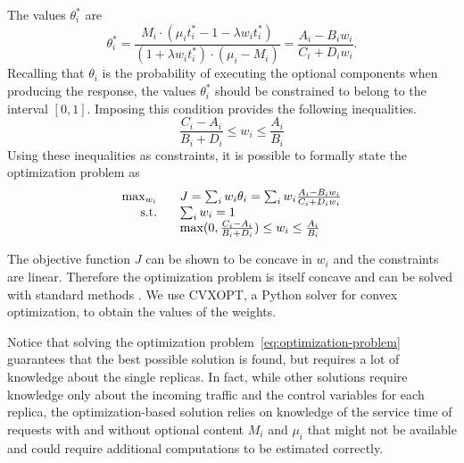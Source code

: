 The values $\theta_i^*$ are
\begin{equation}
  \theta_i^* = \frac{M_i \cdot \left( \mu_i t_i^* - 1 -\lambda w_i
      t_i^* \right)}{{\left( 1+\lambda w_i t_i^* \right) \cdot
      \left(\mu_i-M_i \right)}} = \frac{A_i - B_i w_i}{C_i + D_i w_i}.
  \label{eq:optimal-thetas}
\end{equation}
Recalling that $\theta_i$ is the probability of executing the optional
components when producing the response, the values $\theta_i^*$ should
be constrained to belong to the interval $[0, 1]$. Imposing this
condition provides the following inequalities.
\begin{equation}
  \frac{C_i-A_i}{B_i+D_i} \leq w_i \leq \frac{A_i}{B_i}
  \label{eq:constraints-optimal-thetas}
\end{equation}
Using these inequalities as constraints, it is possible to formally
state the optimization problem as
\begin{equation}
\begin{array}{rl}
  \max_{w_i} \;\;\; & J = \sum_i w_i \theta_i = \sum_i w_i  \frac{A_i - B_i w_i}{C_i + D_i w_i} \\
  \textnormal{s.t.} \;\;\; & \sum_i w_i = 1 \\
  & \max (0,\frac{C_i-A_i}{B_i+D_i}) \leq w_i \leq \frac{A_i}{B_i}
\end{array}
  \label{eq:optimization-problem}
\end{equation}

The objective function $J$ can be shown to be concave in $w_i$ and the
constraints are linear. Therefore the optimization problem is itself
concave and can be solved with standard methods \cite{boydbook}. 
We use CVXOPT, a Python solver for convex optimization, to obtain 
the values of the weights.

Notice that solving the optimization
problem~\eqref{eq:optimization-problem} guarantees that the best
possible solution is found, but requires a lot of knowledge about the
single replicas. In fact, while other solutions require knowledge only
about the incoming traffic and the control variables for each replica,
the optimization-based solution relies on knowledge of the service
time of requests with and without optional content $M_i$ and $\mu_i$
that might not be available and could require additional computations
to be estimated correctly.
